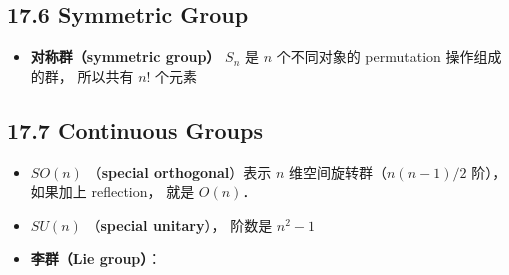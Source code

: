 \subsection{17.6 Symmetric Group}
\begin{itemize}
\item \textbf{对称群（symmetric group）} $S_n$ 是 $n$ 个不同对象的 permutation 操作组成的群， 所以共有 $n!$ 个元素
\end{itemize}

\subsection{17.7 Continuous Groups}
\begin{itemize}
\item $SO(n)$ （\textbf{special orthogonal}）表示 $n$ 维空间旋转群（$n(n-1)/2$ 阶）， 如果加上 reflection， 就是 $O(n)$．
\item $SU(n)$ （\textbf{special unitary}）， 阶数是 $n^2 - 1$
\item \textbf{李群（Lie group）}： 
\end{itemize}
